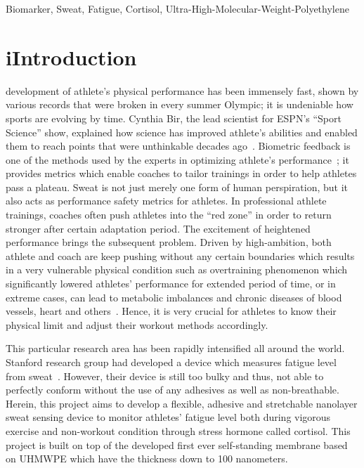 \documentclass[journal]{IEEEtran}
\begin{document}
\begin{IEEEkeywords}
Biomarker, Sweat, Fatigue, Cortisol, Ultra-High-Molecular-Weight-Polyethylene 
\end{IEEEkeywords}

\section{iIntroduction}
 development of athlete’s physical performance has been immensely fast, shown by various records that were broken in every summer Olympic; it is undeniable how sports are evolving by time. Cynthia Bir, the  lead  scientist  for  ESPN’s  “Sport  Science”  show,  explained  how  science  has improved athlete’s abilities and enabled them to reach points that were unthinkable decades ago~\cite{SkinSystems}. Biometric feedback is one of the methods used by the experts in optimizing athlete’s performance~\cite{Biofeedback}; it provides metrics which enable coaches to tailor trainings in order to help athletes pass a plateau. Sweat is not just merely one form of human perspiration, but it also acts as performance safety metrics for athletes. In professional athlete trainings, coaches often push athletes into the “red zone” in order to return stronger after certain adaptation period. The excitement of heightened performance brings the subsequent problem. Driven by high-ambition, both athlete and coach are keep pushing without any certain boundaries which results in a very vulnerable physical condition such as overtraining phenomenon which significantly lowered athletes’ performance for extended period of time, or in extreme cases, can lead to metabolic imbalances and chronic diseases of blood vessels, heart and others~\cite{OvertrainReviewDirections, ReviewOvertraining, ImmuneOvertraining}. Hence, it is very crucial for athletes to know their physical limit and adjust their workout methods accordingly.

This particular research area has been rapidly intensified all around the world. Stanford research group had developed a device which measures fatigue level from sweat~\cite{Parlak_membraneElectro}. However, their device is still too bulky and thus, not able to perfectly conform without the use of any adhesives as well as non-breathable. Herein, this project aims to develop a flexible, adhesive and stretchable nanolayer sweat sensing device to monitor athletes’ fatigue level both during vigorous exercise and non-workout condition through stress hormone called cortisol. This project is built on top of the developed first ever self-standing membrane based on UHMWPE which have the thickness down to 100 nanometers. 
\end{document}
